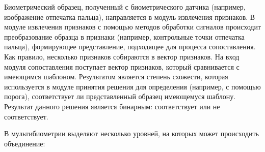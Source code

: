 \documentclass[12pt,a4paper]{article}					%
\begin{document}
Биометрический образец, полученный с биометрического датчика (например, изображение отпечатка пальца), направляется в модуль извлечения признаков. В модуле извлечения признаков с помощью методов обработки сигналов происходит преобразование образца в признаки (например, контрольные точки отпечатка пальца), формирующее представление, подходящее для процесса сопоставления. Как правило, несколько признаков собираются в вектор признаков. На вход модуля сопоставления поступает вектор признаков, который сравнивается с имеющимся шаблоном. Результатом является степень схожести, которая используется в модуле принятия решения для определения (например, с помощью порога), соответствует ли представленный образец имеющемуся шаблону. Результат данного решения является бинарным: соответствует или не соответствует.

В мультибиометрии выделяют несколько уровней, на которых может происходить объединение:
\end{document}
